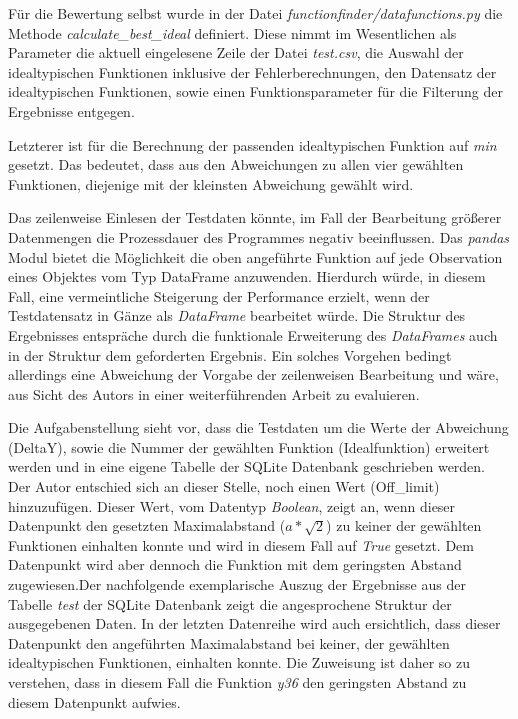 Für die Bewertung selbst wurde in der Datei \emph{functionfinder/datafunctions.py} die Methode \emph{calculate\_best\_ideal} definiert. Diese nimmt im Wesentlichen als Parameter die aktuell eingelesene Zeile der Datei \emph{test.csv}, die Auswahl der idealtypischen Funktionen inklusive der Fehlerberechnungen, den Datensatz der idealtypischen Funktionen, sowie einen Funktionsparameter für die Filterung der Ergebnisse entgegen. 

Letzterer ist für die Berechnung der passenden idealtypischen Funktion auf \emph{min} gesetzt. Das bedeutet, dass aus den Abweichungen zu allen vier gewählten Funktionen, diejenige mit der kleinsten Abweichung gewählt wird.

Das zeilenweise Einlesen der Testdaten könnte, im Fall der Bearbeitung größerer Datenmengen die Prozessdauer des Programmes negativ beeinflussen. Das \emph{pandas} Modul bietet die Möglichkeit die oben angeführte Funktion auf jede Observation eines Objektes vom Typ DataFrame anzuwenden. Hierdurch würde, in diesem Fall, eine vermeintliche Steigerung der Performance erzielt, wenn der Testdatensatz in Gänze als \emph{DataFrame} bearbeitet würde. Die Struktur des Ergebnisses entspräche durch die funktionale Erweiterung des \emph{DataFrames} auch in der Struktur dem geforderten Ergebnis. Ein solches Vorgehen bedingt allerdings eine Abweichung der Vorgabe der zeilenweisen Bearbeitung und wäre, aus Sicht des Autors in einer weiterführenden Arbeit zu evaluieren.   

Die Aufgabenstellung sieht vor, dass die Testdaten um die Werte der Abweichung (DeltaY), sowie die Nummer der gewählten Funktion (Idealfunktion) erweitert werden und in eine eigene Tabelle der SQLite Datenbank geschrieben werden. Der Autor entschied sich an dieser Stelle, noch einen Wert (Off\_limit) hinzuzufügen. Dieser Wert, vom Datentyp \emph{Boolean}, zeigt an, wenn dieser Datenpunkt den gesetzten Maximalabstand ($a*\sqrt{2}$) zu keiner der gewählten Funktionen einhalten konnte und wird in diesem Fall auf \emph{True} gesetzt. Dem Datenpunkt wird aber dennoch die Funktion mit dem geringsten Abstand zugewiesen.Der nachfolgende exemplarische Auszug der Ergebnisse aus der Tabelle \emph{test} der SQLite Datenbank zeigt die angesprochene Struktur der ausgegebenen Daten. In der letzten Datenreihe wird auch ersichtlich, dass dieser Datenpunkt den angeführten Maximalabstand bei keiner, der gewählten idealtypischen Funktionen, einhalten konnte. Die Zuweisung ist daher so zu verstehen, dass in diesem Fall die Funktion \emph{y36} den geringsten Abstand zu diesem Datenpunkt aufwies.

